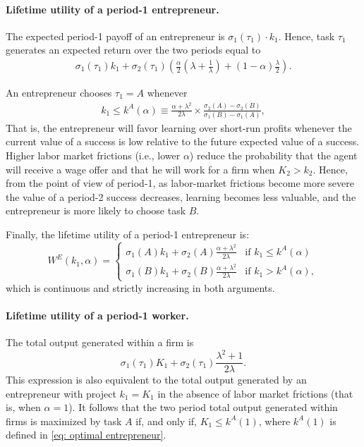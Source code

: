 \documentclass[12pt,american]{paper}
\theoremstyle{remark}
\begin{document}
\paragraph{Lifetime utility of a period-1 entrepreneur.}
The expected period-1 payoff of an entrepreneur is $\sigma_1(\tau_1) \cdot k_1$. Hence, task $\tau_1$ generates an expected return over the two periods equal to
\begin{align*} 
\sigma_1(\tau_1) k_1+  \sigma_2(\tau_1)  \left(  \frac{\alpha}{2} \left( \lambda + \frac{1}{\lambda} \right) + (1-\alpha) \frac{\lambda}{2} \right).
\end{align*}

An entrepreneur chooses $\tau_1=A$ whenever
\begin{align}\label{eq: optimal entrepreneur}
k_1\leq k^A(\alpha) \equiv   \frac{\alpha+\lambda^2}{2\lambda}\times\frac{\sigma_2(A)-\sigma_2(B)}{\sigma_1(B)-\sigma_1(A)},
\end{align}
That is, the entrepreneur will favor learning over short-run profits whenever the current value of a success is low relative to the future expected value of a success. Higher labor market frictions (i.e., lower $\alpha$) reduce the probability that the agent will receive a wage offer and that he will work for a firm when $K_2>k_2$. Hence, from the point of view of period-1, as labor-market frictions become more severe the value of a period-2 success decreases, learning becomes less valuable, and the entrepreneur is more likely to choose task $B$.  

Finally, the lifetime utility of a period-1 entrepreneur is:
\[
W^E(k_1,\alpha)=\begin{cases}
\sigma_1(A) k_1+  \sigma_2(A)  \frac{\alpha+\lambda^2}{2\lambda} &\mbox{if } k_1\leq k^A(\alpha) \\
\sigma_1(B) k_1+  \sigma_2(B)  \frac{\alpha+\lambda^2}{2\lambda} &\mbox{if } k_1 > k^A(\alpha), 
\end{cases}
\]
which is continuous and strictly increasing in both arguments.






\paragraph{Lifetime utility of a period-1 worker.}

The total output generated within a firm is $$\sigma_1(\tau_1)K_1+\sigma_2(\tau_1)\frac{\lambda^2+1}{2\lambda}.$$ This expression is also equivalent to the total output generated by an entrepreneur with project $k_1=K_1$ in the absence of labor market frictions (that is, when $\alpha=1$).   It follows that the two period total output generated within firms is maximized by task $A$ if, and only if, $ K_1\leq  k^A(1)$, where $k^A(1)$ %
is defined in \eqref{eq: optimal entrepreneur}. 
\end{document}
